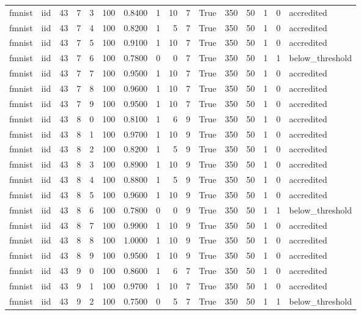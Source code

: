 \begin{tabular}{llrrrrrrrrrrrrrl}
fmnist & iid & 43 & 7 & 3 & 100 & 0.8400 & 1 & 10 & 7 & True & 350 & 50 & 1 & 0 & accredited \\
fmnist & iid & 43 & 7 & 4 & 100 & 0.8200 & 1 & 5 & 7 & True & 350 & 50 & 1 & 0 & accredited \\
fmnist & iid & 43 & 7 & 5 & 100 & 0.9100 & 1 & 10 & 7 & True & 350 & 50 & 1 & 0 & accredited \\
fmnist & iid & 43 & 7 & 6 & 100 & 0.7800 & 0 & 0 & 7 & True & 350 & 50 & 1 & 1 & below\_threshold \\
fmnist & iid & 43 & 7 & 7 & 100 & 0.9500 & 1 & 10 & 7 & True & 350 & 50 & 1 & 0 & accredited \\
fmnist & iid & 43 & 7 & 8 & 100 & 0.9600 & 1 & 10 & 7 & True & 350 & 50 & 1 & 0 & accredited \\
fmnist & iid & 43 & 7 & 9 & 100 & 0.9500 & 1 & 10 & 7 & True & 350 & 50 & 1 & 0 & accredited \\
fmnist & iid & 43 & 8 & 0 & 100 & 0.8100 & 1 & 6 & 9 & True & 350 & 50 & 1 & 0 & accredited \\
fmnist & iid & 43 & 8 & 1 & 100 & 0.9700 & 1 & 10 & 9 & True & 350 & 50 & 1 & 0 & accredited \\
fmnist & iid & 43 & 8 & 2 & 100 & 0.8200 & 1 & 5 & 9 & True & 350 & 50 & 1 & 0 & accredited \\
fmnist & iid & 43 & 8 & 3 & 100 & 0.8900 & 1 & 10 & 9 & True & 350 & 50 & 1 & 0 & accredited \\
fmnist & iid & 43 & 8 & 4 & 100 & 0.8800 & 1 & 5 & 9 & True & 350 & 50 & 1 & 0 & accredited \\
fmnist & iid & 43 & 8 & 5 & 100 & 0.9600 & 1 & 10 & 9 & True & 350 & 50 & 1 & 0 & accredited \\
fmnist & iid & 43 & 8 & 6 & 100 & 0.7800 & 0 & 0 & 9 & True & 350 & 50 & 1 & 1 & below\_threshold \\
fmnist & iid & 43 & 8 & 7 & 100 & 0.9900 & 1 & 10 & 9 & True & 350 & 50 & 1 & 0 & accredited \\
fmnist & iid & 43 & 8 & 8 & 100 & 1.0000 & 1 & 10 & 9 & True & 350 & 50 & 1 & 0 & accredited \\
fmnist & iid & 43 & 8 & 9 & 100 & 0.9500 & 1 & 10 & 9 & True & 350 & 50 & 1 & 0 & accredited \\
fmnist & iid & 43 & 9 & 0 & 100 & 0.8600 & 1 & 6 & 7 & True & 350 & 50 & 1 & 0 & accredited \\
fmnist & iid & 43 & 9 & 1 & 100 & 0.9700 & 1 & 10 & 7 & True & 350 & 50 & 1 & 0 & accredited \\
fmnist & iid & 43 & 9 & 2 & 100 & 0.7500 & 0 & 5 & 7 & True & 350 & 50 & 1 & 1 & below\_threshold \\

\end{tabular}
